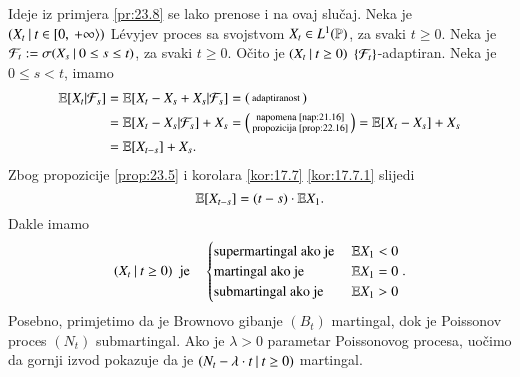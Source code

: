 \begin{pr} \label{pr:23.9}
    Ideje iz primjera \ref{pr:23.8} se lako prenose i na ovaj slu\v caj.
    Neka je $({X_t} \: | \: {t \in [ {0}, \: {+\infty} \rangle})$ L\' evyjev proces sa svojstvom $X_t \in L^1 (\mathbb{P})$, za svaki $t \geq 0$.
    Neka je $\mathcal{F}_t := \sigma({X_s} \: | \: {0 \leq s \leq t})$, za svaki $t \geq 0$.
    O\v cito je $({X_t} \: | \: {t \geq 0})$ $\{\mathcal{F}_t\}$-adaptiran.
    Neka je $0 \leq s < t$, imamo
    \begin{equation*}
        \begin{aligned}
            \mathbb{E} [X_t | \mathcal{F}_s] &= \mathbb{E} [X_t - X_s + X_s | \mathcal{F}_s] =
            \begin{psmallmatrix}
                \textnormal{adaptiranost}
            \end{psmallmatrix}\\
            &= \mathbb{E} [X_t - X_s | \mathcal{F}_s] + X_s =
            \begin{psmallmatrix}
                \textnormal{napomena \ref{nap:21.16}}\\
                \textnormal{propozicija \ref{prop:22.16}}
            \end{psmallmatrix}
            = \mathbb{E} [X_t - X_s] + X_s\\
            &= \mathbb{E} [X_{t - s}] + X_s.
        \end{aligned}
    \end{equation*}
    Zbog propozicije \ref{prop:23.5} i korolara \ref{kor:17.7} \ref{kor:17.7.1} slijedi
    \begin{equation*}
        \mathbb{E} [X_{t - s}] = (t - s) \cdot \mathbb{E} X_1.
    \end{equation*}
    Dakle imamo
    \begin{equation*}
        ({X_t} \: | \: { t \geq 0}) \; \textnormal{ je} \quad
        \begin{cases}
            \textnormal{supermartingal ako je } &\mathbb{E} X_1 < 0\\
            \textnormal{martingal ako je } &\mathbb{E} X_1 = 0\\
            \textnormal{submartingal ako je } &\mathbb{E} X_1 > 0
        \end{cases}.
    \end{equation*}
    Posebno, primjetimo da je Brownovo gibanje $(B_t)$ martingal, dok je Poissonov proces $(N_t)$ submartingal.
    Ako je $\lambda > 0$ parametar Poissonovog procesa, uo\v cimo da gornji izvod pokazuje da je $({N_t - \lambda \cdot t} \: | \: {t \geq 0})$ martingal.
\end{pr}

